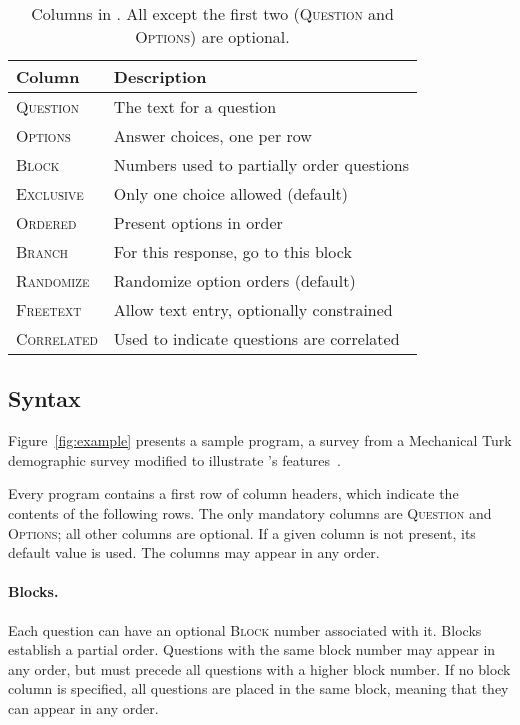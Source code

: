 \begin{table}[!t]
\centering
\begin{tabular}{>{\small}l|>{\small}l}
\textbf{Column} & \textbf{Description} \\
\hline
\textsc{Question}  & The text for a question \\
\textsc{Options}   & Answer choices, one per row \\
\hline
\textsc{Block}     & Numbers used to partially order questions \\
\textsc{Exclusive} & Only one choice allowed (default) \\
\textsc{Ordered}   & Present options in order \\
\textsc{Branch}    & For this response, go to this block \\
\textsc{Randomize} & Randomize option orders (default) \\
\textsc{Freetext}  & Allow text entry, optionally constrained \\
\textsc{Correlated} & Used to indicate questions are correlated \\
\end{tabular}
\caption{Columns in \surveyman{}. All except the first two (\textsc{Question} and \textsc{Options}) are optional.\label{tab:columns}}
\end{table}

\subsection{Syntax}

Figure~\ref{fig:example} presents a sample \surveyman{} program, a
survey from a Mechanical Turk demographic survey modified to
illustrate \surveyman{}'s features~\cite{ipeirotis2010demographics}.

Every \surveyman{} program contains a first row of column headers,
which indicate the contents of the following rows. The only mandatory
columns are \textsc{Question} and \textsc{Options}; all other columns
are optional. If a given column is not present, its default value is
used. The columns may appear in any order. 

\paragraph{Blocks.}
Each question can have an optional \textsc{Block} number associated
with it. Blocks establish a partial order. Questions with the same
block number may appear in any order, but must precede all questions
with a higher block number. If no block column is specified, all
questions are placed in the same block, meaning that they can appear
in any order.

